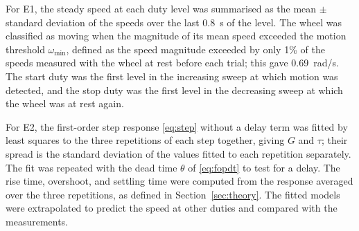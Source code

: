 For E1, the steady speed at each duty level was summarised as the mean $\pm$ standard deviation of the speeds over the last 0.8~s of the level.
The wheel was classified as moving when the magnitude of its mean speed exceeded the motion threshold $\omega_{\min}$, defined as the speed magnitude exceeded by only 1\% of the speeds measured with the wheel at rest before each trial; this gave 0.69~rad/s.
The start duty was the first level in the increasing sweep at which motion was detected, and the stop duty was the first level in the decreasing sweep at which the wheel was at rest again.

For E2, the first-order step response \eqref{eq:step} without a delay term was fitted by least squares to the three repetitions of each step together, giving $G$ and $\tau$; their spread is the standard deviation of the values fitted to each repetition separately. The fit was repeated with the dead time $\theta$ of \eqref{eq:fopdt} to test for a delay. The rise time, overshoot, and settling time were computed from the response averaged over the three repetitions, as defined in Section~\ref{sec:theory}. The fitted models were extrapolated to predict the speed at other duties and compared with the measurements.
